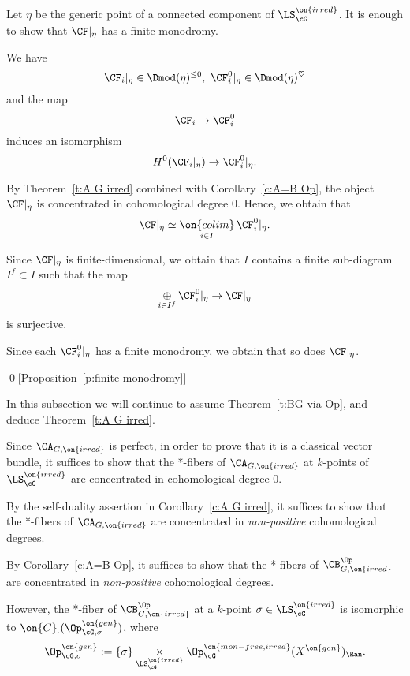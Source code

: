\documentclass[9pt]{amsart}
\theoremstyle{remark}
\theoremstyle{definition}
\theoremstyle{remark}
\newcommand{\thmref}[1]{Theorem~\ref{#1}}
\newcommand{\propref}[1]{Proposition~\ref{#1}}
\newcommand{\corref}[1]{Corollary~\ref{#1}}
\numberwithin{equation}{section}
\begin{document}
Let $\eta$ be the generic point of a connected component of $\LS_\cG^{\on{irred}}$. It is enough to show that
$\CF|_\eta$ has a finite monodromy.

\medskip

We have
$$\CF_i|_{\eta}\in \Dmod(\eta)^{\leq 0},\,\, \CF_i^0|_{\eta}\in \Dmod(\eta)^\heartsuit$$
and the map
$$\CF_i\to \CF_i^0$$ 
induces an isomorphism 
$$H^0(\CF_i|_\eta)\to \CF_i^0|_\eta.$$

By \thmref{t:A G irred} combined with \corref{c:A=B Op}, the object 
$\CF|_{\eta}$ is concentrated in cohomological degree $0$. Hence, we obtain that 
$$\CF|_{\eta} \simeq \underset{i\in I}{\on{colim}}\, \CF^0_i|_{\eta}.$$

\medskip

Since $\CF|_{\eta}$ is finite-dimensional, we obtain that $I$ contains a finite sub-diagram $I^f\subset I$ such that the map
$$\underset{i\in I^f}\oplus\, \CF^0_i|_{\eta}\to \CF|_\eta$$
is surjective.

\medskip

Since each $\CF^0_i|_\eta$ has a finite monodromy, we obtain that so does $\CF|_\eta$. 

\qed[\propref{p:finite monodromy}]

\ssec{Proof of \thmref{t:A G irred}} \label{ss:proof A G irred}

In this subsection we will continue to assume \thmref{t:BG via Op}, and deduce
\thmref{t:A G irred}. 

\sssec{}

Since $\CA_{G,\on{irred}}$ is perfect, in order to prove that it is a classical vector bundle, 
it suffices to show that the *-fibers of
$\CA_{G,\on{irred}}$ at $k$-points of $\LS^{\on{irred}}_\cG$ are concentrated in cohomological
degree $0$.

\medskip

By the self-duality assertion in \corref{c:A G irred}, it suffices to show that the *-fibers of 
$\CA_{G,\on{irred}}$ are concentrated in \emph{non-positive} cohomological degrees.

\sssec{}

By \corref{c:A=B Op}, it suffices to show that the *-fibers of 
$\CB^{\Op}_{G,\on{irred}}$ are concentrated in \emph{non-positive} cohomological degrees.

\medskip

However, the *-fiber of $\CB^{\Op}_{G,\on{irred}}$ at a $k$-point $\sigma\in \LS^{\on{irred}}_\cG$
is isomorphic to $\on{C}_\cdot(\Op^{\on{gen}}_{\cG,\sigma})$, 
where
$$\Op^{\on{gen}}_{\cG,\sigma}:=\{\sigma\}\underset{\LS^{\on{irred}}_\cG}\times \Op^{\on{mon-free,irred}}_\cG(X^{\on{gen}})_\Ran.$$
\end{document}
